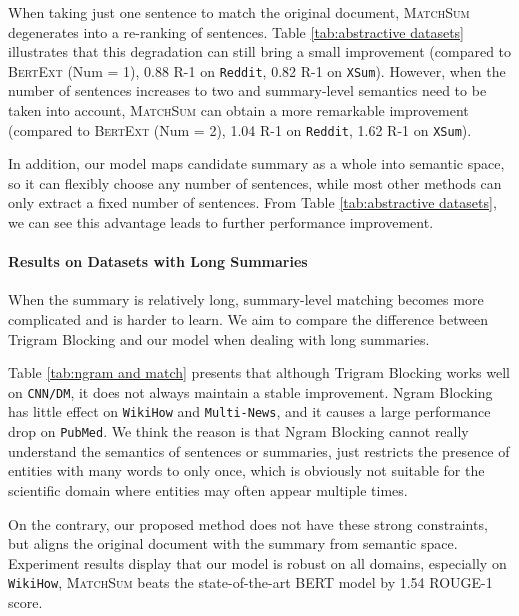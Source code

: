 \documentclass[11pt,a4paper]{article}
\begin{document}
When taking just one sentence to match the original document, \textsc{MatchSum} degenerates into a re-ranking of sentences. Table \ref{tab:abstractive datasets} illustrates that this degradation can still bring a small improvement (compared to \textsc{BertExt} (Num = 1),  0.88 R-1 on \texttt{Reddit}, 0.82 R-1 on \texttt{XSum}). However, when the number of sentences increases to two and summary-level semantics need to be taken into account, \textsc{MatchSum} can obtain a more remarkable improvement (compared to \textsc{BertExt} (Num = 2), 1.04 R-1 on \texttt{Reddit}, 1.62 R-1 on \texttt{XSum}).

In addition, our model maps candidate summary as a whole into semantic space, so it can flexibly choose any number of sentences, while most other methods can only extract a fixed number of sentences. From Table \ref{tab:abstractive datasets}, we can see this advantage leads to further performance improvement.





\paragraph{Results on Datasets with Long Summaries}
When the summary is relatively long, summary-level matching becomes more complicated and is harder to learn.
We aim to compare the difference between Trigram Blocking and our model when dealing with long summaries.



Table \ref{tab:ngram and match} presents that although Trigram Blocking works well on \texttt{CNN/DM}, it does not always maintain a stable improvement. Ngram Blocking has little effect on \texttt{WikiHow} and \texttt{Multi-News}, and it causes a large performance drop on \texttt{PubMed}. We think the reason is that Ngram Blocking cannot really understand the semantics of sentences or summaries, just restricts the presence of entities with many words to only once, which is obviously not suitable for the scientific domain where entities may often appear multiple times.

On the contrary, our proposed method does not have these strong constraints, but aligns the original document with the summary from semantic space. Experiment results display that our model is robust on all domains, especially on \texttt{WikiHow}, \textsc{MatchSum} beats the state-of-the-art BERT model by 1.54 ROUGE-1 score.
\end{document}
